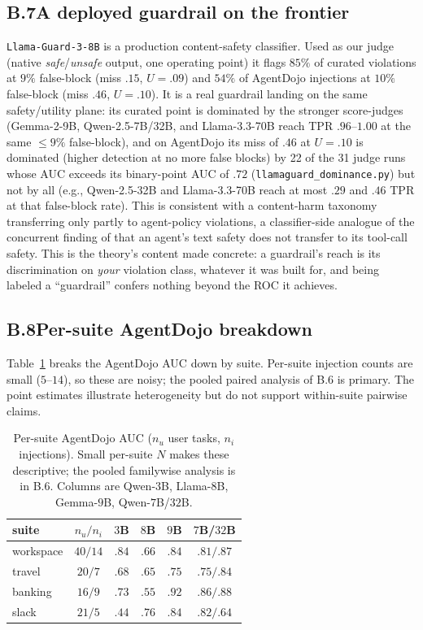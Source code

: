 \subsection*{B.7\quad A deployed guardrail on the frontier}
\texttt{Llama-Guard-3-8B} \citep{inan2023llamaguard,llama3herd} is a production content-safety
classifier. Used as our judge (native \textit{safe}/\textit{unsafe} output, one
operating point) it flags $85\%$ of curated violations at $9\%$ false-block (miss
$.15$, $U=.09$) and $54\%$ of AgentDojo injections at $10\%$ false-block (miss
$.46$, $U=.10$). It is a real guardrail landing on the same safety/utility plane:
its curated point is dominated by the stronger score-judges (Gemma-2-9B, Qwen-2.5-7B/32B,
and Llama-3.3-70B reach TPR $.96$--$1.00$ at the same ${\le}9\%$ false-block), and on
AgentDojo its miss of $.46$ at $U=.10$ is dominated (higher detection at no more false
blocks) by 22 of the 31 judge runs whose AUC exceeds its binary-point AUC of $.72$
(\texttt{llamaguard\_dominance.py}) but not by all (e.g., Qwen-2.5-32B and Llama-3.3-70B reach at most $.29$ and $.46$ TPR at
that false-block rate). This is consistent with a content-harm taxonomy transferring
only partly to agent-policy violations, a classifier-side analogue of
the concurrent finding of \citet{cartagena2026gap} that an agent's text safety does not transfer
to its tool-call safety. This is the theory's content made concrete: a guardrail's reach
is its discrimination on \emph{your} violation class, whatever it was built for, and
being labeled a ``guardrail'' confers nothing beyond the ROC it achieves.

\subsection*{B.8\quad Per-suite AgentDojo breakdown}
Table~\ref{tab:persuite} breaks the AgentDojo AUC down by suite. Per-suite injection
counts are small ($5$--$14$), so these are noisy; the pooled paired analysis of
B.6 is primary. The point estimates illustrate heterogeneity but do not support
within-suite pairwise claims.

\begin{table}[t]
\caption{Per-suite AgentDojo AUC ($n_u$ user tasks, $n_i$ injections). Small
per-suite $N$ makes these descriptive; the pooled familywise analysis is in
B.6. Columns are Qwen-$3$B, Llama-$8$B, Gemma-$9$B,
Qwen-$7$B/$32$B.}
\label{tab:persuite}
\centering\small\setlength{\tabcolsep}{5pt}
\begin{tabular}{@{}lccccc@{}}
\toprule
suite & $n_{u}/n_{i}$ & $3$B & $8$B & $9$B & $7$B/$32$B\\
\midrule
workspace & $40/14$ & $.84$ & $.66$ & $.84$ & $.81/.87$\\
travel    & $20/7$  & $.68$ & $.65$ & $.75$ & $.75/.84$\\
banking   & $16/9$  & $.73$ & $.55$ & $.92$ & $.86/.88$\\
slack     & $21/5$  & $.44$ & $.76$ & $.84$ & $.82/.64$\\
\bottomrule
\end{tabular}
\end{table}

